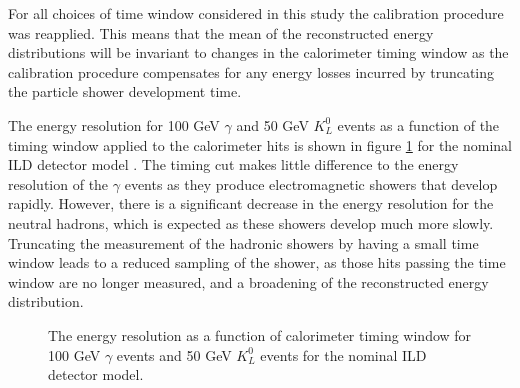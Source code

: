For all choices of time window considered in this study the calibration procedure was reapplied.  This means that the mean of the reconstructed energy distributions will be invariant to changes in the calorimeter timing window as the calibration procedure compensates for any energy losses incurred by truncating the particle shower development time.  

The energy resolution for 100 GeV $\gamma$ and 50 GeV $K^{0}_{L}$ events as a function of the timing window applied to the calorimeter hits is shown in figure \ref{fig:ertimingcuts} for the nominal ILD detector model .  The timing cut makes little difference to the energy resolution of the $\gamma$ events as they produce electromagnetic showers that develop rapidly.  However, there is a significant decrease in the energy resolution for the neutral hadrons, which is expected as these showers develop much more slowly.  Truncating the measurement of the hadronic showers by having a small time window leads to a reduced sampling of the shower, as those hits passing the time window are no longer measured, and a broadening of the reconstructed energy distribution.  

\begin{figure}
\caption[The energy resolution as a function of calorimeter timing window for \protect{} 100 GeV $\gamma$ events and \protect{} 50 GeV $K^{0}_{L}$ events for the nominal ILD detector model.]{The energy resolution as a function of calorimeter timing window for \protect{} 100 GeV $\gamma$ events and \protect{} 50 GeV $K^{0}_{L}$ events for the nominal ILD detector model.}
\label{fig:ertimingcuts}
\end{figure}

